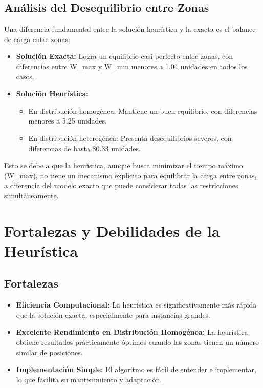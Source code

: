\documentclass{hw-template}
\begin{document}
\subsection{Análisis del Desequilibrio entre Zonas}

Una diferencia fundamental entre la solución heurística y la exacta es el balance de carga entre zonas:

\begin{itemize}
    \item \textbf{Solución Exacta:} Logra un equilibrio casi perfecto entre zonas, con diferencias entre W\_max y W\_min menores a 1.04 unidades en todos los casos.
    
    \item \textbf{Solución Heurística:} 
    \begin{itemize}
        \item En distribución homogénea: Mantiene un buen equilibrio, con diferencias menores a 5.25 unidades.
        \item En distribución heterogénea: Presenta desequilibrios severos, con diferencias de hasta 80.33 unidades.
    \end{itemize}
\end{itemize}

Esto se debe a que la heurística, aunque busca minimizar el tiempo máximo (W\_max), no tiene un mecanismo explícito para equilibrar la carga entre zonas, a diferencia del modelo exacto que puede considerar todas las restricciones simultáneamente.
\clearpage
\section{Fortalezas y Debilidades de la Heurística}

\subsection*{Fortalezas}

\begin{itemize}
    \item \textbf{Eficiencia Computacional:} La heurística es significativamente más rápida que la solución exacta, especialmente para instancias grandes.
    
    \item \textbf{Excelente Rendimiento en Distribución Homogénea:} La heurística obtiene resultados prácticamente óptimos cuando las zonas tienen un número similar de posiciones.
    
    \item \textbf{Implementación Simple:} El algoritmo es fácil de entender e implementar, lo que facilita su mantenimiento y adaptación.
\end{itemize}
\end{document}
